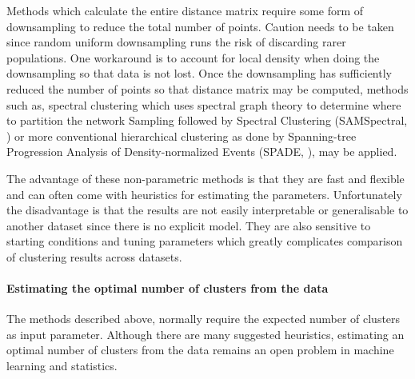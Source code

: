 Methods which calculate the entire distance matrix require some form of downsampling to reduce the total number of points.
Caution needs to be taken since random uniform downsampling runs the risk of discarding rarer populations.
One workaround is to account for local density when doing the downsampling so that data is not lost.
Once the downsampling has sufficiently reduced the number of points so that distance matrix may be computed,
methods such as, spectral clustering which uses spectral graph theory to determine where to partition the network
Sampling followed by Spectral Clustering (SAMSpectral, \citet{Zare:2010cw}) or more conventional hierarchical clustering
as done by Spanning-tree Progression Analysis of Density-normalized Events (SPADE, \citet{Simonds:2011jh}), may be applied.

The advantage of these non-parametric methods is that they are fast and flexible and can often come with heuristics for estimating the parameters.
Unfortunately the disadvantage is that the results are not easily interpretable or generalisable to another dataset since there is no explicit model.
They are also sensitive to starting conditions and tuning parameters which greatly complicates comparison of clustering results across datasets.


\paragraph{Estimating the optimal number of clusters from the data}

The methods described above, normally require the expected number of clusters as input parameter.
Although there are many suggested heuristics,
estimating an optimal number of clusters from the data remains an open problem in machine learning and statistics.

